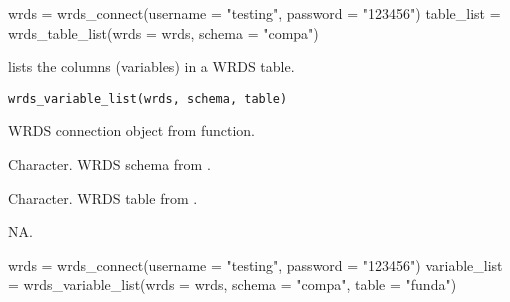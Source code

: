 \documentclass[a4paper]{book}
\begin{document}
%
\begin{Examples}
\begin{ExampleCode}
wrds = wrds_connect(username = "testing", password = "123456")
table_list = wrds_table_list(wrds = wrds, schema = "compa")
\end{ExampleCode}
\end{Examples}
%
\begin{Description}\relax
{} lists the columns (variables) in a WRDS table.
\end{Description}
%
\begin{Usage}
\begin{verbatim}
wrds_variable_list(wrds, schema, table)
\end{verbatim}
\end{Usage}
%
\begin{Arguments}
\begin{ldescription}
\item[\code{wrds}] WRDS connection object from  function.

\item[\code{schema}] Character. WRDS schema from .

\item[\code{table}] Character. WRDS table from .
\end{ldescription}
\end{Arguments}
%
\begin{Details}\relax
NA.
\end{Details}
%
\begin{Examples}
\begin{ExampleCode}
wrds = wrds_connect(username = "testing", password = "123456")
variable_list = wrds_variable_list(wrds = wrds, schema = "compa", table = "funda")
\end{ExampleCode}
\end{Examples}
\printindex{}
\end{document}

